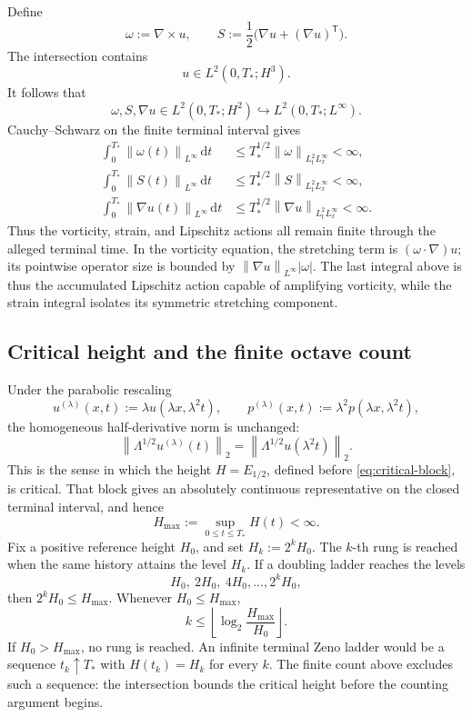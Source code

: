 \documentclass[11pt,letterpaper]{article}
\theoremstyle{definition}
\theoremstyle{remark}
\newcommand{\norm}[1]{\left\lVert #1\right\rVert}
\newcommand{\dd}{\,\mathrm d}
\newcommand{\vort}{\omega}
\newcommand{\strain}{S}
\begin{document}
Define
\[
\vort:=\nabla\times u,
\qquad
\strain:=\frac12\bigl(\nabla u+(\nabla u)^{\mathsf T}\bigr).
\]
The intersection contains
\[
u\in L^2(0,T_*;H^3).
\]
It follows that
\[
\vort,\strain,\nabla u
\in L^2(0,T_*;H^2)
\hookrightarrow L^2(0,T_*;L^\infty).
\]
Cauchy--Schwarz on the finite terminal interval gives
\begin{align*}
\int_0^{T_*}\norm{\vort(t)}_{L^\infty}\dd t
&\le T_*^{1/2}\norm{\vort}_{L_t^2L_x^\infty}<\infty,\\
\int_0^{T_*}\norm{\strain(t)}_{L^\infty}\dd t
&\le T_*^{1/2}\norm{\strain}_{L_t^2L_x^\infty}<\infty,\\
\int_0^{T_*}\norm{\nabla u(t)}_{L^\infty}\dd t
&\le T_*^{1/2}\norm{\nabla u}_{L_t^2L_x^\infty}<\infty.
\end{align*}
Thus the vorticity, strain, and Lipschitz actions all remain finite through
the alleged terminal time.  In the vorticity equation, the stretching term
is \((\vort\cdot\nabla)u\); its pointwise operator size is bounded by
\(\norm{\nabla u}_{L^\infty}|\vort|\).  The last integral above is thus the
accumulated Lipschitz action capable of amplifying vorticity, while the
strain integral isolates its symmetric stretching component.

\subsection{Critical height and the finite octave count}

Under the parabolic rescaling
\[
u^{(\lambda)}(x,t):=\lambda u(\lambda x,\lambda^2t),
\qquad
p^{(\lambda)}(x,t):=\lambda^2p(\lambda x,\lambda^2t),
\]
the homogeneous half-derivative norm is unchanged:
\[
\norm{\Lambda^{1/2}u^{(\lambda)}(t)}_2
=\norm{\Lambda^{1/2}u(\lambda^2t)}_2.
\]
This is the sense in which the height \(H=E_{1/2}\), defined before
\eqref{eq:critical-block}, is critical.  That block gives an absolutely continuous
representative on the closed terminal interval, and hence
\begin{equation}
H_{\max}:=\sup_{0\le t\le T_*}H(t)<\infty.
\label{eq:height-bound}
\end{equation}
Fix a positive reference height \(H_0\), and set \(H_k:=2^kH_0\).  The
\(k\)-th rung is reached when the same history attains the level \(H_k\).
If a doubling ladder reaches the levels
\[
H_0,\ 2H_0,\ 4H_0,\ldots,2^kH_0,
\]
then \(2^kH_0\le H_{\max}\).  Whenever \(H_0\le H_{\max}\),
\begin{equation}
k\le
\left\lfloor\log_2\frac{H_{\max}}{H_0}\right\rfloor.
\label{eq:octave-count}
\end{equation}
If \(H_0>H_{\max}\), no rung is reached.  An infinite terminal Zeno ladder
would be a sequence \(t_k\uparrow T_*\) with \(H(t_k)=H_k\) for every \(k\).
The finite count above excludes such a sequence: the intersection bounds
the critical height before the counting argument begins.
\end{document}
